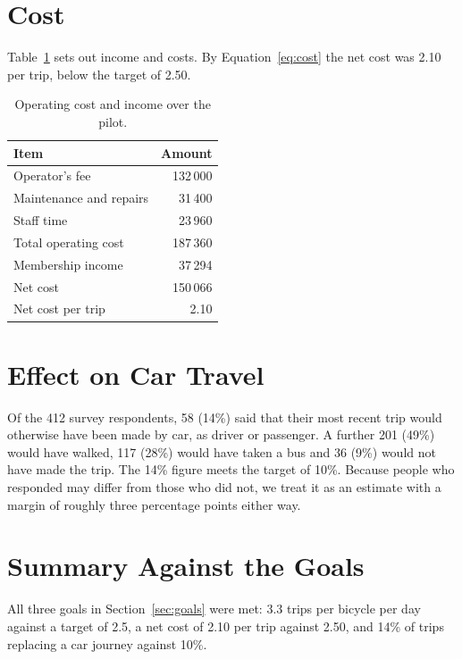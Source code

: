 \section{Cost}
Table~\ref{tab:cost} sets out income and costs. By Equation~\eqref{eq:cost} the net cost was 2.10 per trip, below the target of 2.50.

\begin{table}[htbp]
  \centering
  \caption{Operating cost and income over the pilot.}
  \label{tab:cost}
  \begin{tabular}{lr}
    \toprule
    Item & Amount \\
    \midrule
    Operator's fee            & 132\,000 \\
    Maintenance and repairs   &  31\,400 \\
    Staff time                &  23\,960 \\
    \midrule
    Total operating cost      & 187\,360 \\
    Membership income         &  37\,294 \\
    \midrule
    Net cost                  & 150\,066 \\
    Net cost per trip         &     2.10 \\
    \bottomrule
  \end{tabular}
\end{table}

\section{Effect on Car Travel}
Of the 412 survey respondents, 58 (14\%) said that their most recent trip would otherwise have been made by car, as driver or passenger. A further 201 (49\%) would have walked, 117 (28\%) would have taken a bus and 36 (9\%) would not have made the trip. The 14\% figure meets the target of 10\%. Because people who responded may differ from those who did not, we treat it as an estimate with a margin of roughly three percentage points either way.

\section{Summary Against the Goals}
All three goals in Section~\ref{sec:goals} were met: 3.3 trips per bicycle per day against a target of 2.5, a net cost of 2.10 per trip against 2.50, and 14\% of trips replacing a car journey against 10\%.
